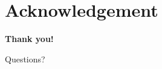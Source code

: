 \documentclass[10pt]{beamer}
\begin{document}
\section*{Acknowledgement}

\begin{frame}
    \vspace{1.0cm}
    \centering
    \textcolor{myNewColorA}{\Huge \textbf{Thank you!}}

    \vspace{0.5cm}
    {\large Questions?}
\end{frame}

\end{document}
